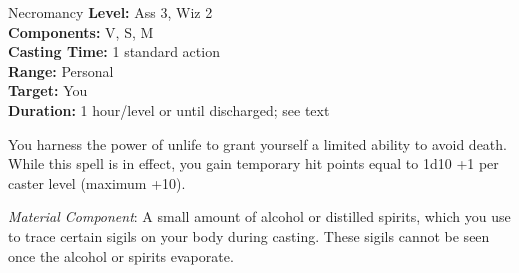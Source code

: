 {Necromancy}
{
	\textbf{Level:}
	Ass 3, Wiz 2\\
	\textbf{Components:}
	V, S, M\\
	\textbf{Casting Time:}
	1 standard action\\
	\textbf{Range:}
	Personal\\
	\textbf{Target:}
	You\\
	\textbf{Duration:}
	1 hour/level or until discharged; see text\\
}
{
	You harness the power of unlife to grant yourself a limited ability to avoid death. While this spell is in effect, you gain temporary hit points equal to 1d10 +1 per caster level (maximum +10).

	\textit{Material Component}:
	A small amount of alcohol or distilled spirits, which you use to trace certain sigils on your body during casting. These sigils cannot be seen once the alcohol or spirits evaporate.

}
